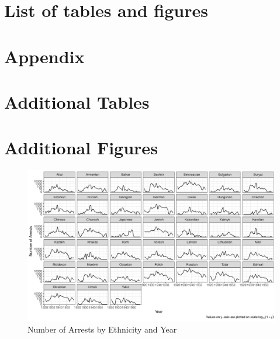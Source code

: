 \newpage
\section*{List of tables and figures}
\listoftables
\listoffigures



\newpage
\section*{Appendix}

\section*{Additional Tables}
{

\newpage


\newpage


\newpage

\thispagestyle{empty}

\newpage


\newpage


\newpage
}
\section*{Additional Figures}
\begin{figure}[!h]
\centering
\includegraphics[width=1.2\textwidth]{plots/arrests/facet_by_year.pdf}
\caption{Number of Arrests by Ethnicity and Year}
\label{fig:facet_by_year}
\end{figure}

